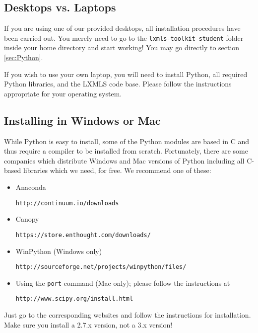 \subsection{Desktops vs. Laptops}

If you are using one of our provided desktops, all installation procedures have been carried out. You merely need to go to the \verb+lxmls-toolkit-student+ folder inside your home directory and start working! You may go directly to section \ref{sec:Python}.

If you wish to use your own laptop, you will need to install Python, all required Python libraries, and the LXMLS code base. Please follow the instructions appropriate for your operating system.

\subsection{Installing in Windows or Mac}

While Python is easy to install, some of the Python modules are based in C and thus require a compiler to be installed from scratch. Fortunately, there are some companies which distribute Windows and Mac versions of Python including all C-based libraries which we need, for free. We recommend one of these:

\begin{itemize}
\item Anaconda 
\begin{verbatim}
http://continuum.io/downloads
\end{verbatim}
%
\item Canopy
\begin{verbatim}
https://store.enthought.com/downloads/
\end{verbatim}
%
\item WinPython (Windows only)
\begin{verbatim}
http://sourceforge.net/projects/winpython/files/
\end{verbatim}
%
\item Using the \verb+port+ command (Mac only); please follow the instructions at
\begin{verbatim}
http://www.scipy.org/install.html
\end{verbatim}
%
\end{itemize}

Just go to the corresponding websites and follow the instructions for installation. Make sure you install a 2.7.x version, not a 3.x version!

